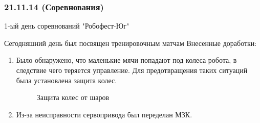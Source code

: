 \subsubsection{21.11.14 (Соревнования)}

\begin{center}
	1-ый день соревнований "Робофест-Юг"
\end{center}
Сегодняшний день был посвящен тренировочным матчам
\newline
Внесенные доработки:
\begin{enumerate}
	\item Было обнаружено, что  маленькие мячи попадают под колеса робота, в следствие чего теряется управление. Для предотвращения таких ситуаций была установлена защита колес.
	\begin{figure}[H]
		\begin{minipage}[h]{0.9\linewidth}
		\end{minipage}
		\caption{Защита колес от шаров}
	\end{figure}			
	\item Из-за неисправности сервопривода был переделан МЗК.
	\begin{figure}[H]
		\begin{minipage}[h]{0.9\linewidth}

\end{minipage}
\end{figure}
\end{enumerate}
